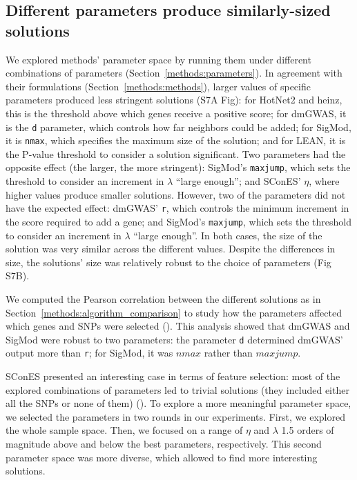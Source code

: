\documentclass[10pt,letterpaper]{article}
\begin{document}
\subsection{Different parameters produce similarly-sized solutions}
\label{results:parameters}

We explored methods' parameter space by running them under different combinations of parameters (Section~\ref{methods:parameters}). In agreement with their formulations (Section~\ref{methods:methods}), larger values of specific parameters produced less stringent solutions (S7A Fig): for HotNet2 and heinz, this is the threshold above which genes receive a positive score; for dmGWAS, it is the \texttt{d} parameter, which controls how far neighbors could be added; for SigMod, it is \texttt{nmax}, which specifies the maximum size of the solution; and for LEAN, it is the P-value threshold to consider a solution significant. Two parameters had the opposite effect (the larger, the more stringent): SigMod's \texttt{maxjump}, which sets the threshold to consider an increment in $\lambda$ ``large enough''; and SConES' $\eta$, where higher values produce smaller solutions. However, two of the parameters did not have the expected effect: dmGWAS' \texttt{r}, which controls the minimum increment in the score required to add a gene; and SigMod's \texttt{maxjump}, which sets the threshold to consider an increment in $\lambda$ ``large enough''. In both cases, the size of the solution was very similar across the different values. Despite the differences in size, the solutions' size was relatively robust to the choice of parameters (Fig S7B).

We computed the Pearson correlation between the different solutions as in Section~\ref{methods:algorithm_comparison} to study how the parameters affected which genes and SNPs were selected (). This analysis showed that dmGWAS and SigMod were robust to two parameters: the parameter \texttt{d} determined dmGWAS' output more than \texttt{r}; for SigMod, it was $nmax$ rather than $maxjump$.

SConES presented an interesting case in terms of feature selection: most of the explored combinations of parameters led to trivial solutions (they included either all the SNPs or none of them) (). To explore a more meaningful parameter space, we selected the parameters in two rounds in our experiments. First, we explored the whole sample space. Then, we focused on a range of $\eta$ and $\lambda$ 1.5 orders of magnitude above and below the best parameters, respectively. This second parameter space was more diverse, which allowed to find more interesting solutions.
\end{document}
